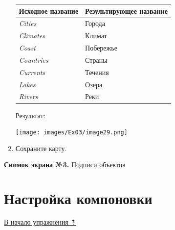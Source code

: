 \documentclass[12pt,]{book}
\begin{document}
\begin{enumerate}
  \begin{longtable}[]{@{}ll@{}}
  \toprule
  \textbf{Исходное название} & \textbf{Результирующее название}\tabularnewline
  \midrule
  \endhead
  \emph{Cities} & Города\tabularnewline
  \emph{Climates} & Климат\tabularnewline
  \emph{Coast} & Побережье\tabularnewline
  \emph{Countries} & Страны\tabularnewline
  \emph{Currents} & Течения\tabularnewline
  \emph{Lakes} & Озера\tabularnewline
  \emph{Rivers} & Реки\tabularnewline
  \bottomrule
  \end{longtable}

  Результат:

  \texttt{[image: images/Ex03/image29.png]}
\item
  Сохраните карту.
\end{enumerate}

\textbf{Снимок экрана №3.} Подписи объектов

\hypertarget{map-design-climates-layout}{%
\section{Настройка компоновки}\label{map-design-climates-layout}}

\protect\hyperlink{map-design-climates}{В начало упражнения ⇡}
\end{document}

